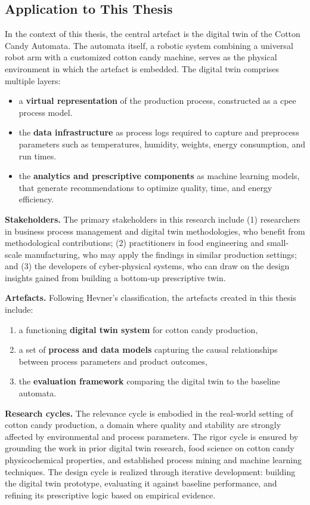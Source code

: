 \subsection*{Application to This Thesis}
In the context of this thesis, the central artefact is the digital twin of the Cotton Candy Automata. The automata itself, a robotic system combining a universal robot arm with a customized cotton candy machine, serves as the physical environment in which the artefact is embedded. The digital twin comprises multiple layers: 
\begin{itemize}
    \item a \textbf{virtual representation} of the production process, constructed as a cpee process model.
    \item the \textbf{data infrastructure} as process logs required to capture and preprocess parameters such as temperatures, humidity, weights, energy consumption, and run times.
    \item the \textbf{analytics and prescriptive components} as machine learning models, that generate recommendations to optimize quality, time, and energy efficiency.
\end{itemize}

\textbf{Stakeholders.} The primary stakeholders in this research include (1) researchers in business process management and digital twin methodologies, who benefit from methodological contributions; (2) practitioners in food engineering and small-scale manufacturing, who may apply the findings in similar production settings; and (3) the developers of cyber-physical systems, who can draw on the design insights gained from building a bottom-up prescriptive twin.

\textbf{Artefacts.} Following Hevner’s classification, the artefacts created in this thesis include:
\begin{enumerate}
    \item a functioning \textbf{digital twin system} for cotton candy production,
    \item a set of \textbf{process and data models} capturing the causal relationships between process parameters and product outcomes,
    \item the \textbf{evaluation framework} comparing the digital twin to the baseline automata.
\end{enumerate}

\textbf{Research cycles.} The relevance cycle is embodied in the real-world setting of cotton candy production, a domain where quality and stability are strongly affected by environmental and process parameters. The rigor cycle is ensured by grounding the work in prior digital twin research, food science on cotton candy physicochemical properties, and established process mining and machine learning techniques. The design cycle is realized through iterative development: building the digital twin prototype, evaluating it against baseline performance, and refining its prescriptive logic based on empirical evidence.



